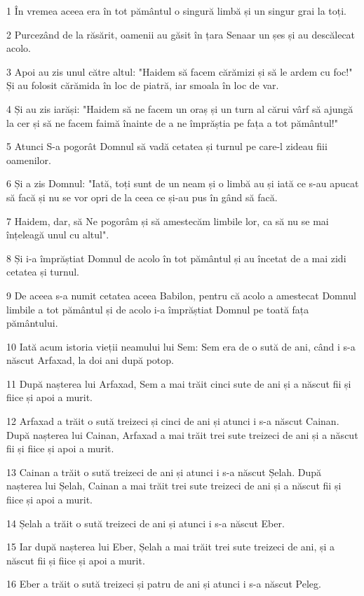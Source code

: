 \par 1 În vremea aceea era în tot pământul o singură limbă și un singur grai la toți.
\par 2 Purcezând de la răsărit, oamenii au găsit în țara Senaar un șes și au descălecat acolo.
\par 3 Apoi au zis unul către altul: "Haidem să facem cărămizi și să le ardem cu foc!" Și au folosit cărămida în loc de piatră, iar smoala în loc de var.
\par 4 Și au zis iarăși: "Haidem să ne facem un oraș și un turn al cărui vârf să ajungă la cer și să ne facem faimă înainte de a ne împrăștia pe fața a tot pământul!"
\par 5 Atunci S-a pogorât Domnul să vadă cetatea și turnul pe care-l zideau fiii oamenilor.
\par 6 Și a zis Domnul: "Iată, toți sunt de un neam și o limbă au și iată ce s-au apucat să facă și nu se vor opri de la ceea ce și-au pus în gând să facă.
\par 7 Haidem, dar, să Ne pogorâm și să amestecăm limbile lor, ca să nu se mai înțeleagă unul cu altul".
\par 8 Și i-a împrăștiat Domnul de acolo în tot pământul și au încetat de a mai zidi cetatea și turnul.
\par 9 De aceea s-a numit cetatea aceea Babilon, pentru că acolo a amestecat Domnul limbile a tot pământul și de acolo i-a împrăștiat Domnul pe toată fața pământului.
\par 10 Iată acum istoria vieții neamului lui Sem: Sem era de o sută de ani, când i s-a născut Arfaxad, la doi ani după potop.
\par 11 După nașterea lui Arfaxad, Sem a mai trăit cinci sute de ani și a născut fii și fiice și apoi a murit.
\par 12 Arfaxad a trăit o sută treizeci și cinci de ani și atunci i s-a născut Cainan. După nașterea lui Cainan, Arfaxad a mai trăit trei sute treizeci de ani și a născut fii și fiice și apoi a murit.
\par 13 Cainan a trăit o sută treizeci de ani și atunci i s-a născut Șelah. După nașterea lui Șelah, Cainan a mai trăit trei sute treizeci de ani și a născut fii și fiice și apoi a murit.
\par 14 Șelah a trăit o sută treizeci de ani și atunci i s-a născut Eber.
\par 15 Iar după nașterea lui Eber, Șelah a mai trăit trei sute treizeci de ani, și a născut fii și fiice și apoi a murit.
\par 16 Eber a trăit o sută treizeci și patru de ani și atunci i s-a născut Peleg.
